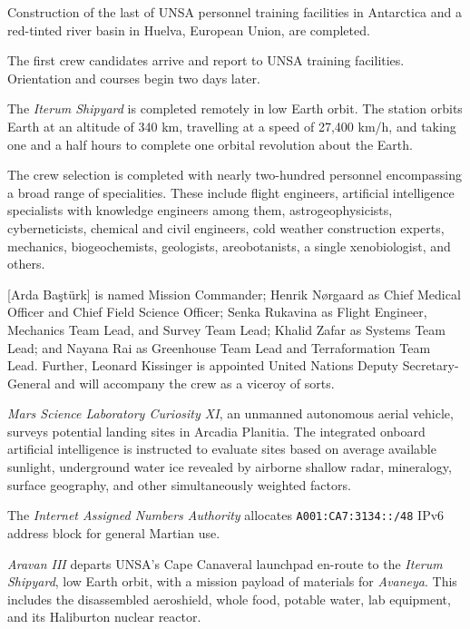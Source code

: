 Construction of the last of UNSA personnel training facilities in Antarctica and a red-tinted river basin in Huelva, European Union, are completed.
\StopTimelineDate

The first crew candidates arrive and report to UNSA training facilities. Orientation and courses begin two days later.
\StopTimelineDate

The {\it Iterum Shipyard} is completed remotely in low Earth orbit. The station orbits Earth at an altitude of 340 km, travelling at a speed of 27,400 km/h, and taking one and a half hours to complete one orbital revolution about the Earth.
\StopTimelineDate

The crew selection is completed with nearly two-hundred personnel encompassing a broad range of specialities. These include flight engineers, artificial intelligence specialists with knowledge engineers among them, astrogeophysicists, cyberneticists, chemical and civil engineers, cold weather construction experts, mechanics, biogeochemists, geologists, areobotanists, a single xenobiologist, and others.

[Arda Baştürk] is named Mission Commander; Henrik Nørgaard as Chief Medical Officer and Chief Field Science Officer; Senka Rukavina as Flight Engineer, Mechanics Team Lead, and Survey Team Lead; Khalid Zafar as Systems Team Lead; and Nayana Rai as Greenhouse Team Lead and Terraformation Team Lead. Further, Leonard Kissinger is appointed United Nations Deputy Secretary-General and will accompany the crew as a viceroy of sorts.
\StopTimelineDate

{\it Mars Science Laboratory Curiosity XI}, an unmanned autonomous aerial vehicle, surveys potential landing sites in Arcadia Planitia. The integrated onboard artificial intelligence is instructed to evaluate sites based on average available sunlight, underground water ice revealed by airborne shallow radar, mineralogy, surface geography, and other simultaneously weighted factors.
\StopTimelineDate

The {\it Internet Assigned Numbers Authority} allocates {\tt A001:CA7:3134::/48} IPv6 address block for general Martian use. 
\StopTimelineDate

{\it Aravan III} departs UNSA's Cape Canaveral launchpad en-route to the {\it Iterum Shipyard}, low Earth orbit, with a mission payload of materials for {\it Avaneya}. This includes the disassembled aeroshield, whole food, potable water, lab equipment, and its Haliburton nuclear reactor.
\StopTimelineDate

